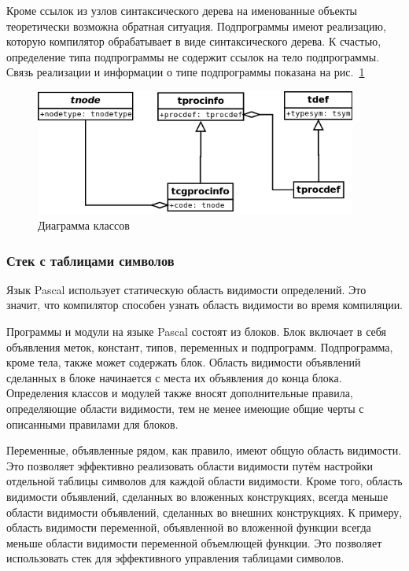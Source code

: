 \documentclass{imcs}
\begin{document}
Кроме ссылок из узлов синтаксического дерева на именованные объекты теоретически возможна обратная
ситуация. Подпрограммы имеют реализацию, которую компилятор обрабатывает в виде синтаксического
дерева. К счастью, определение типа подпрограммы не содержит ссылок на тело подпрограммы. Связь
реализации и информации о типе подпрограммы показана на рис.~\ref{tprocinfo}

\begin{figure}[htb]
\centering
\includegraphics[width=400px]{./uml/tprocinfo.png}
\caption{Диаграмма классов}
\label{tprocinfo}
\end{figure}

\subsubsection{Стек с таблицами символов}

Язык Pascal использует статическую область видимости определений. Это значит, что компилятор
способен узнать область видимости во время компиляции.

Программы и модули на языке Pascal состоят из блоков.
Блок включает в себя объявления меток, констант, типов, переменных и подпрограмм.
Подпрограмма, кроме тела, также может содержать блок. Область видимости объявлений сделанных в блоке
начинается с места их объявления до конца блока\cite{refguide}.
Определения классов и модулей также вносят дополнительные
правила, определяющие области видимости, тем не менее имеющие общие черты с описанными правилами для блоков.

Переменные, объявленные рядом, как правило, имеют общую область видимости. 
Это позволяет эффективно реализовать области видимости
путём настройки отдельной таблицы символов для каждой области видимости\cite{dragonbook}. 
Кроме того, область видимости
объявлений, сделанных во вложенных конструкциях, всегда меньше области видимости объявлений, сделанных
во внешних конструкциях. К примеру, область видимости переменной, объявленной во вложенной функции 
всегда меньше области видимости переменной объемлющей функции. Это позволяет использовать стек для
эффективного управления таблицами символов. 
\end{document}
